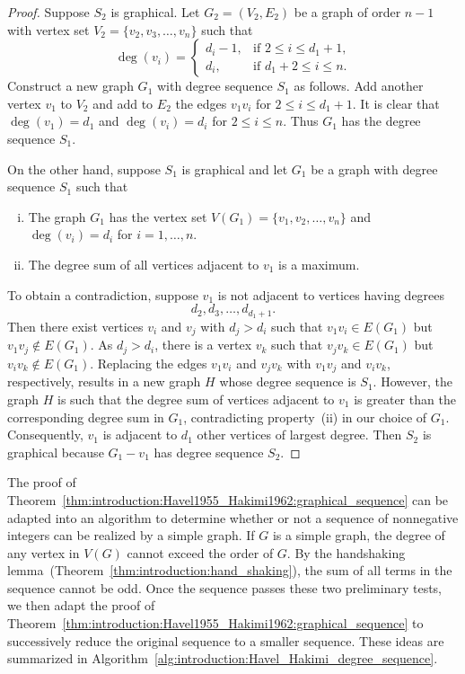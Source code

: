 \begin{proof}
Suppose $S_2$ is graphical. Let $G_2 = (V_2, E_2)$ be a graph of order
$n - 1$ with vertex set $V_2 = \{v_2, v_3, \dots, v_n\}$ such that
\[
\deg(v_i)
=
\begin{cases}
d_i - 1, & \text{if $2 \leq i \leq d_1 + 1$,} \\[4pt]
d_i,     & \text{if $d_1 + 2 \leq i \leq n$.}
\end{cases}
\]
Construct a new graph $G_1$ with degree sequence $S_1$ as follows. Add
another vertex $v_1$ to $V_2$ and add to $E_2$ the edges $v_1 v_i$ for
$2 \leq i \leq d_1 + 1$. It is clear that $\deg(v_1) = d_1$ and
$\deg(v_i) = d_i$ for $2 \leq i \leq n$. Thus $G_1$ has the degree
sequence $S_1$.

On the other hand, suppose $S_1$ is graphical and let $G_1$ be a graph
with degree sequence $S_1$ such that
\begin{enumerate}[(i)]
\item The graph $G_1$ has the vertex set
  $V(G_1) = \{v_1, v_2, \dots, v_n\}$ and $\deg(v_i) = d_i$ for
  $i = 1, \dots, n$.

\item The degree sum of all vertices adjacent to $v_1$ is a maximum.
\end{enumerate}
To obtain a contradiction, suppose $v_1$ is not adjacent to vertices
having degrees
\[
d_2, d_3, \dots, d_{d_1 + 1}.
\]
Then there exist vertices $v_i$ and $v_j$ with $d_j > d_i$ such that
$v_1 v_i \in E(G_1)$ but $v_1 v_j \not\in E(G_1)$. As $d_j > d_i$,
there is a vertex $v_k$ such that $v_j v_k \in E(G_1)$ but
$v_i v_k \not\in E(G_1)$. Replacing the edges $v_1 v_i$ and $v_j v_k$
with $v_1 v_j$ and $v_i v_k$, respectively, results in a new graph $H$
whose degree sequence is $S_1$. However, the graph $H$ is such that
the degree sum of vertices adjacent to $v_1$ is greater than the
corresponding degree sum in $G_1$, contradicting property~(ii) in our
choice of $G_1$. Consequently, $v_1$ is adjacent to $d_1$ other
vertices of largest degree. Then $S_2$ is graphical because
$G_1 - v_1$ has degree sequence $S_2$.
\end{proof}

The proof of
Theorem~\ref{thm:introduction:Havel1955_Hakimi1962:graphical_sequence}
can be adapted into an algorithm to determine whether or not a
sequence of nonnegative integers can be realized by a simple
graph. If $G$ is a simple graph, the degree of any vertex in $V(G)$
cannot exceed the order of $G$. By the handshaking
lemma~(Theorem~\ref{thm:introduction:hand_shaking}), the sum of all
terms in the sequence cannot be odd. Once the sequence passes these
two preliminary tests, we then adapt the proof of
Theorem~\ref{thm:introduction:Havel1955_Hakimi1962:graphical_sequence}
to successively reduce the original sequence to a smaller
sequence. These ideas are summarized in
Algorithm~\ref{alg:introduction:Havel_Hakimi_degree_sequence}.


